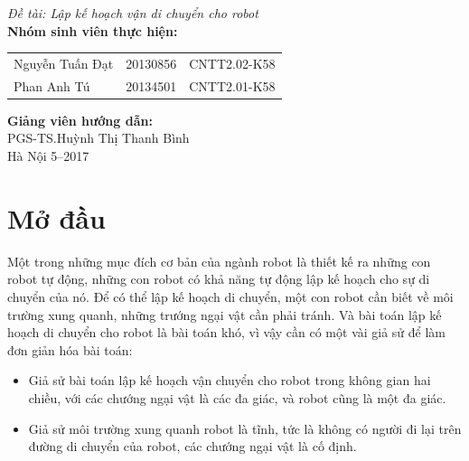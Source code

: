 \documentclass[a4paper,12pt]{report}
\renewcommand{\contentsname}{Mục lục}
\begin{document}
\begin{center}
{\fontsize{18}{20}\selectfont \emph{Đề tài: Lập kế hoạch vận di chuyển cho robot}}\\[2cm]
\hspace{-5cm}\fontsize{14}{16}\selectfont \textbf{Nhóm sinh viên thực hiện:}\\[0.1cm] 
\begin{longtable}{l c c}
Nguyễn Tuấn Đạt & 20130856 & CNTT2.02-K58 \\
Phan Anh Tú &   20134501 & CNTT2.01-K58\\
\end{longtable}
\vspace{0.5cm}
\hspace{-6cm}\fontsize{14}{16}\selectfont \textbf{Giảng viên hướng dẫn:}\\[0.1cm]
\hspace{-2.7cm}\fontsize{14}{16}\selectfont PGS-TS.Huỳnh Thị Thanh Bình \\[3cm]
\fontsize{16}{19}\selectfont Hà Nội 5--2017
\end{center}
\newpage
\pdfbookmark{\contentsname}{toc}
\tableofcontents

\chapter{Mở đầu}
Một trong những mục đích cơ bản của ngành robot là thiết kế ra những con robot tự động, những con robot có khả năng tự động lập kế hoạch cho sự di chuyển của nó. Để có thể lập kế hoạch di chuyển, một con robot cần biết về môi trường xung quanh, những trướng ngại vật cần phải tránh. Và bài toán lập kế hoạch di chuyển cho robot là bài toán khó, vì vậy cần có một vài giả sử để làm đơn giản hóa bài toán: 
\begin{itemize}
\item Giả sử bài toán lập kế hoạch vận chuyển cho robot trong không gian hai chiều, với các chướng ngại vật là các đa giác, và robot cũng là một đa giác. 
\item Giả sử môi trường xung quanh robot là tĩnh, tức là không có người đi lại trên đường di chuyển của robot, các chướng ngại vật là cố định.
\end{itemize}
\end{document}
